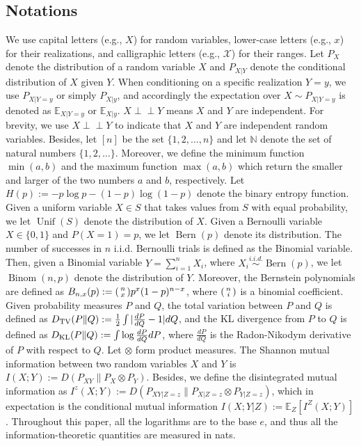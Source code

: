 \documentclass[onecolumn,romanappendices,10pt]{IEEEtran}
\newcommand{\Xcal}{{\mathcal X}}
\newcommand{\EE}{{\mathbb{E}}}
\newcommand{\NN}{{\mathbb{N}}}
\DeclareMathOperator{\Uniform}{Unif}
\DeclareMathOperator{\Bernoulli}{Bern}
\DeclareMathOperator{\Binomial}{Binom}
\newcommand\indep{ \perp \!\!\! \perp}
\begin{document}
	\subsection{Notations}
	We use capital letters (e.g., $X$) for random variables, lower-case letters (e.g., $x$) for their realizations, and calligraphic letters (e.g., $\Xcal$) for their ranges. Let $P_X$ denote the distribution of a random variable $X$ and $P_{X|Y}$ denote the conditional distribution of $X$ given $Y$. When conditioning on a specific realization $Y=y$, we use $P_{X|Y =y}$ or simply $P_{X|y}$, and accordingly the expectation over $X \sim P_{X|Y =y}$ is denoted as $\EE_{X|Y =y}$ or $\EE_{X|y}$. $X \indep Y$ means $X$ and $Y$ are independent. For brevity, we use $X \indep Y$ to indicate that $X$ and $Y$ are independent random variables. Besides, let $[n]$ be the set $\{1, 2, \ldots, n\}$ and let $\NN$ denote the set of natural numbers $\{1,2,\ldots\}$. Moreover, we define the minimum function $\min(a, b)$ and the maximum function $\max(a, b)$ which return the smaller and larger of the two numbers $a$ and $b$, respectively. Let $H(p) := -p \log p - (1 - p) \log (1 - p)$ denote the binary entropy function. Given a uniform variable $X \in S$ that takes values from $S$ with equal probability, we let $\Uniform(S)$ denote the distribution of $X$. Given a Bernoulli variable $X \in \{0, 1\}$ and $P(X = 1) = p$, we let $\Bernoulli(p)$ denote its distribution. The number of successes in $n$ i.i.d. Bernoulli trials is defined as the Binomial variable. Then, given a Binomial variable $Y = \sum_{i=1}^{n} X_i$, where $X_i \overset{i.i.d.}{\sim} \Bernoulli(p)$, we let $\Binomial(n, p)$ denote the distribution of $Y$. Moreover, the Bernstein polynomials are defined as $B_{n,x}(p) := \begin{psmallmatrix} n \\ x \end{psmallmatrix} p^x (1-p)^{n-x}$, where $\begin{psmallmatrix} n \\ i \end{psmallmatrix}$ is a binomial coefficient. Given probability measures $P$ and $Q$, the total variation between $P$ and $Q$ is defined as $D_{\textnormal{TV}}(P \| Q) := \frac{1}{2} \int | \frac{d P}{d Q} - 1 | d Q$, and the KL divergence from $P$ to $Q$ is defined as $D_{\textnormal{KL}}(P \| Q) := \int \log \frac{d P}{d Q} d P$, where $\frac{d P}{d Q}$ is the Radon-Nikodym derivative of $P$ with respect to $Q$. Let $\otimes$ form product measures. The Shannon mutual information between two random variables $X$ and $Y$ is $I(X; Y) := D\left( P_{XY} \| P_X \otimes P_Y \right)$. Besides, we define the disintegrated mutual information as $I^z(X; Y) := D\left( P_{XY | Z = z} \| P_{X | Z = z} \otimes P_{Y | Z = z} \right)$, which in expectation is the conditional mutual information $I(X; Y | Z) := \EE_Z \left[ I^Z(X; Y)\right]$. Throughout this paper, all the logarithms are to the base $e$, and thus all the information-theoretic quantities are measured in nats.
	
\end{document}
